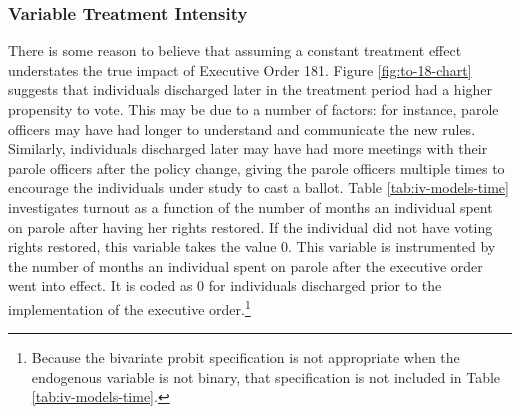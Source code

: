 \documentclass[
  12pt,
]{article}
\begin{document}
\hypertarget{variable-treatment-intensity}{%
\subsubsection*{Variable Treatment Intensity}\label{variable-treatment-intensity}}

There is some reason to believe that assuming a constant treatment effect understates the true impact of Executive Order 181. Figure \ref{fig:to-18-chart} suggests that individuals discharged later in the treatment period had a higher propensity to vote. This may be due to a number of factors: for instance, parole officers may have had longer to understand and communicate the new rules. Similarly, individuals discharged later may have had more meetings with their parole officers after the policy change, giving the parole officers multiple times to encourage the individuals under study to cast a ballot. Table \ref{tab:iv-models-time} investigates turnout as a function of the number of months an individual spent on parole after having her rights restored. If the individual did not have voting rights restored, this variable takes the value 0. This variable is instrumented by the number of months an individual spent on parole after the executive order went into effect. It is coded as 0 for individuals discharged prior to the implementation of the executive order.\footnote{Because the bivariate probit specification is not appropriate when the endogenous variable is not binary, that specification is not included in Table \ref{tab:iv-models-time}.}
\end{document}
